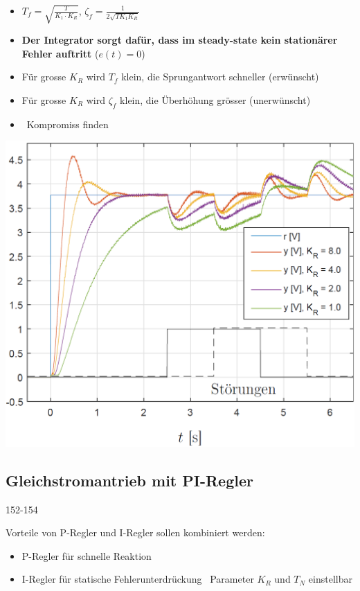 \begin{minipage}[c]{0.48\columnwidth}
    \begin{itemize}
        \item $T_f = \sqrt{ \frac{T}{K_1 \cdot K_R} }$, $\zeta_f = \frac{1}{2 \sqrt{T K_1 K_R}}$
        \item \textbf{Der Integrator sorgt dafür, dass im steady-state kein stationärer Fehler auftritt} ($e(t) = 0$)
        \item Für grosse $K_R$ wird $T_f$ klein, die Sprungantwort schneller (erwünscht)
        \item Für grosse $K_R$ wird $\zeta_f$ klein, die Überhöhung grösser (unerwünscht)
        \item \textrightarrow\ Kompromiss finden
    \end{itemize}
\end{minipage}
\hfill
\begin{minipage}[c]{0.48\columnwidth}
    \includegraphics[width=\columnwidth]{images/gleichstromantrieb_i-regler_step_response.png}
\end{minipage}


\subsection{Gleichstromantrieb mit PI-Regler}{152-154}

Vorteile von P-Regler und I-Regler sollen kombiniert werden:
\begin{itemize}
    \item P-Regler für schnelle Reaktion
    \item I-Regler für statische Fehlerunterdrückung
        \textrightarrow\ Parameter $K_R$ und $T_N$ einstellbar
\end{itemize}


